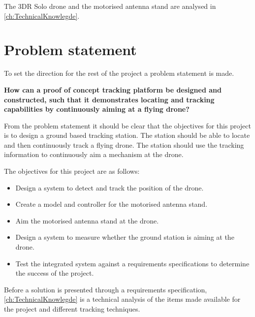 The 3DR Solo drone and the motorised antenna stand are analysed in \autoref{ch:TechnicalKnowlegde}.
 
\section{Problem statement} \label{sec:problem_statement}
To set the direction for the rest of the project a problem statement is made.

\bigskip
\noindent\textbf{How can a proof of concept tracking platform be designed and constructed, such that it demonstrates locating and tracking capabilities by continuously aiming at a flying drone?}
\bigskip

From the problem statement it should be clear that the objectives for this project is to design a ground based tracking station. The station should be able to locate and then continuously track a flying drone. The station should use the tracking information to continuously aim a mechanism at the drone. 

\noindent The objectives for this project are as follows:
\begin{itemize}
	\item Design a system to detect and track the position of the drone.
	\item Create a model and controller for the motorised antenna stand. 
	\item Aim the motorised antenna stand at the drone.   
	\item Design a system to measure whether the ground station is aiming at the drone.
	\item Test the integrated system against a requirements specifications to determine the success of the project.
\end{itemize}

Before a solution is presented through a requirements specification, \autoref{ch:TechnicalKnowlegde} is a technical analysis of the items made available for the project and different tracking techniques.

